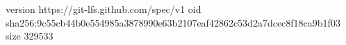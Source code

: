 version https://git-lfs.github.com/spec/v1
oid sha256:9c55cb44b0e554985a3878990e63b2107eaf42862c53d2a7dcec8f18ca9b1f03
size 329533

